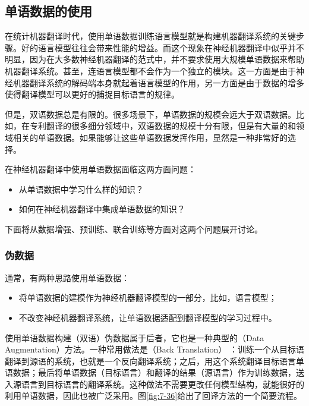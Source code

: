 \subsection{单语数据的使用}\label{subsection-4.2.6}

\parinterval 在统计机器翻译时代，使用单语数据训练语言模型就是构建机器翻译系统的关键步骤。好的语言模型往往会带来性能的增益。而这个现象在神经机器翻译中似乎并不明显，因为在大多数神经机器翻译的范式中，并不要求使用大规模单语数据来帮助机器翻译系统。甚至，连语言模型都不会作为一个独立的模块。这一方面是由于神经机器翻译系统的解码端本身就起着语言模型的作用，另一方面是由于数据的增多使得翻译模型可以更好的捕捉目标语言的规律。

\parinterval 但是，双语数据总是有限的。很多场景下，单语数据的规模会远大于双语数据。比如，在专利翻译的很多细分领域中，双语数据的规模十分有限，但是有大量的和领域相关的单语数据。如果能够让这些单语数据发挥作用，显然是一种非常好的选择。

\parinterval 在神经机器翻译中使用单语数据面临这两方面问题：

\begin{itemize}
\vspace{0.5em}
\item 从单语数据中学习什么样的知识？
\vspace{0.5em}
\item 如何在神经机器翻译中集成单语数据的知识？
\vspace{0.5em}
\end{itemize}

\parinterval 下面将从数据增强、预训练、联合训练等方面对这两个问题展开讨论。

\subsubsection{伪数据}

\parinterval 通常，有两种思路使用单语数据：

\begin{itemize}
\vspace{0.5em}
\item 将单语数据的建模作为神经机器翻译模型的一部分，比如，语言模型；
\vspace{0.5em}
\item 不改变神经机器翻译系统，让单语数据适配到翻译模型的学习过程中。
\vspace{0.5em}
\end{itemize}

\parinterval 使用单语数据构建（双语）伪数据属于后者，它也是一种典型的{\small{}}（Data Augmentation）方法。一种常用做法是{\small{}}（Back Translation） \cite{DBLP:conf/acl/SennrichHB16,DBLP:conf/emnlp/EdunovOAG18}：训练一个从目标语翻译到源语的系统，也就是一个反向翻译系统；之后，用这个系统翻译目标语言单语数据；最后将单语数据（目标语言）和翻译的结果（源语言）作为训练数据，送入源语言到目标语言的翻译系统。这种做法不需要更改任何模型结构，就能很好的利用单语数据，因此也被广泛采用。图\ref{fig:7-36}给出了回译方法的一个简要流程。

